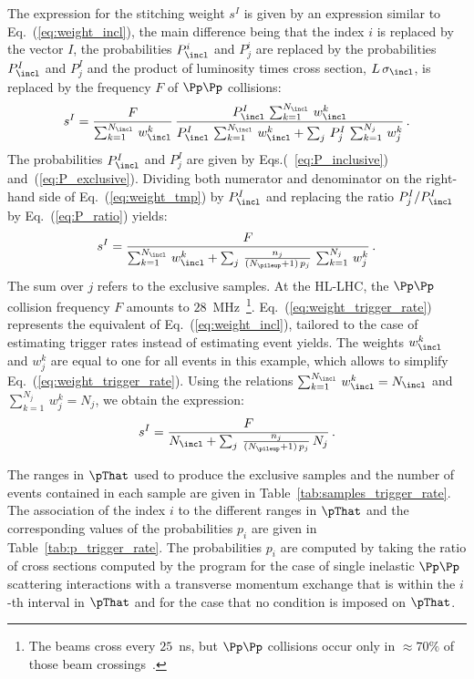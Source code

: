 The expression for the stitching weight $s^{I}$ is given by an expression similar to Eq.~(\ref{eq:weight_incl}),
the main difference being that the index $i$ is replaced by the vector $I$,
the probabilities $P_{\incl}^{i}$ and $P_{j}^{i}$ are replaced by the probabilities $P_{\incl}^{I}$ and $P_{j}^{I}$
and the product of luminosity times cross section, $L \, \sigma_{\incl}$, is replaced by the frequency $F$ of $\Pp\Pp$ collisions:
\begin{equation}
s^{I} = \frac{F}{\sum_{k=1}^{N_{\incl}} \, w_{\incl}^{k}} \, \frac{P_{\incl}^{I} \, \sum_{k=1}^{N_{\incl}} \, w_{\incl}^{k}}{P_{\incl}^{I} \, \sum_{k=1}^{N_{\incl}} \, w_{\incl}^{k} + \sum_{j} \, P_{j}^{I} \, \sum_{k=1}^{N_{j}} \, w_{j}^{k}} \, .
\label{eq:weight_tmp}
\end{equation}
The probabilities $P_{\incl}^{I}$ and $P_{j}^{I}$ are given by Eqs.(~\ref{eq:P_inclusive}) and~(\ref{eq:P_exclusive}).
Dividing both numerator and denominator on the right-hand side of Eq.~(\ref{eq:weight_tmp}) by $P_{\incl}^{I}$ and replacing the ratio $P_{j}^{I}/P_{\incl}^{I}$ by Eq.~(\ref{eq:P_ratio}) yields:
\begin{equation}
s^{I} = \frac{F}{\sum_{k=1}^{N_{\incl}} \, w_{\incl}^{k} + \sum_{j} \, \frac{n_{j}}{(N_{\pileup} + 1) \, p_{j}} \, \sum_{k=1}^{N_{j}} \, w_{j}^{k}} \, .
\label{eq:weight_trigger_rate}
\end{equation}
The sum over $j$ refers to the exclusive samples.
At the HL-LHC, the $\Pp\Pp$ collision frequency $F$ amounts to $28$~MHz~\footnote{
  The beams cross every $25$~ns, but $\Pp\Pp$ collisions occur only in $\approx 70\%$ of those beam crossings~\cite{TDR_Phase2_LHC}.}.
Eq.~(\ref{eq:weight_trigger_rate}) represents the equivalent of Eq.~(\ref{eq:weight_incl}),
tailored to the case of estimating trigger rates instead of estimating event yields.
The weights $w_{\incl}^{k}$ and $w_{j}^{k}$ are equal to one for all events in this example,
which allows to simplify Eq.~(\ref{eq:weight_trigger_rate}).
Using the relations $\sum_{k=1}^{N_{\incl}} \, w_{\incl}^{k} = N_{\incl}$ and $\sum_{k=1}^{N_{j}} \, w_{j}^{k} = N_{j}$,
we obtain the expression:
\begin{equation}
s^{I} = \frac{F}{N_{\incl} + \sum_{j} \, \frac{n_{j}}{(N_{\pileup} + 1) \, p_{j}} \, N_{j}} \, .
\label{eq:weight_trigger_rate_simplified}
\end{equation}

The ranges in $\pThat$ used to produce the exclusive samples and the number of events contained in each sample
are given in Table~\ref{tab:samples_trigger_rate}.
The association of the index $i$ to the different ranges in $\pThat$ and the 
corresponding values of the probabilities $p_{i}$ are given in Table~\ref{tab:p_trigger_rate}.
The probabilities $p_{i}$ are computed by taking the ratio of cross sections computed by the program \PYTHIA
for the case of single inelastic $\Pp\Pp$ scattering interactions with a transverse momentum exchange that is within the $i$-th interval in $\pThat$
and for the case that no condition is imposed on $\pThat$.


